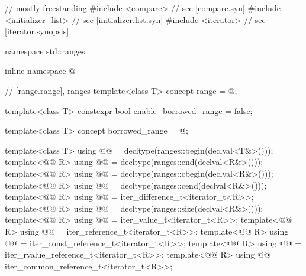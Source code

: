 %
%
\begin{codeblock}
// mostly freestanding
#include <compare>              // see \ref{compare.syn}
#include <initializer_list>     // see \ref{initializer.list.syn}
#include <iterator>             // see \ref{iterator.synopsis}

namespace std::ranges {
  inline namespace @

  // \ref{range.range}, ranges
  template<class T>
    concept range = @\seebelow@;

  template<class T>
    constexpr bool enable_borrowed_range = false;

  template<class T>
    concept borrowed_range = @\seebelow@;

  template<class T>
    using @@ = decltype(ranges::begin(declval<T&>()));
  template<@@ R>
    using @@ = decltype(ranges::end(declval<R&>()));
  template<@@ R>
    using @@ = decltype(ranges::cbegin(declval<R&>()));
  template<@@ R>
    using @@ = decltype(ranges::cend(declval<R&>()));
  template<@@ R>
    using @@ = iter_difference_t<iterator_t<R>>;
  template<@@ R>
    using @@ = decltype(ranges::size(declval<R&>()));
  template<@@ R>
    using @@ = iter_value_t<iterator_t<R>>;
  template<@@ R>
    using @@ = iter_reference_t<iterator_t<R>>;
  template<@@ R>
    using @@ = iter_const_reference_t<iterator_t<R>>;
  template<@@ R>
    using @@ = iter_rvalue_reference_t<iterator_t<R>>;
  template<@@ R>
    using @@ = iter_common_reference_t<iterator_t<R>>;

}
\end{codeblock}
